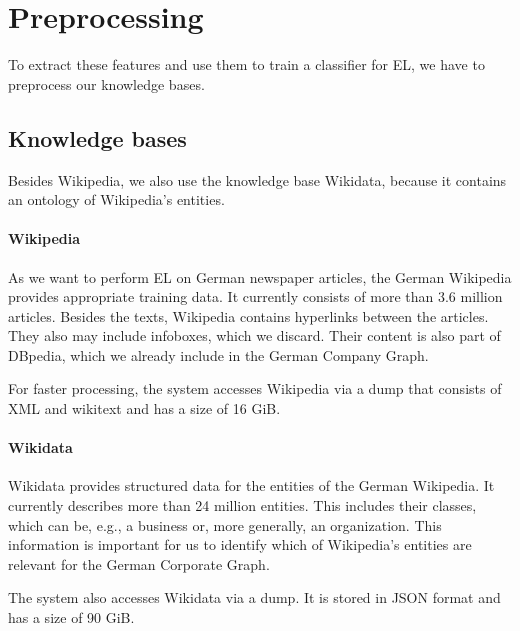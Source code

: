 \section{Preprocessing}
\label{sec:preprocessing}
To extract these features and use them to train a classifier for EL, we have to preprocess our knowledge bases.



\subsection{Knowledge bases}
Besides Wikipedia, we also use the knowledge base Wikidata, because it contains an ontology of Wikipedia's entities.


\paragraph{Wikipedia}
As we want to perform EL on German newspaper articles, the German Wikipedia provides appropriate training data. It currently consists of more than 3.6 million articles. Besides the texts, Wikipedia contains hyperlinks between the articles. They also may include infoboxes, which we discard. Their content is also part of DBpedia\footnotemark{}, which we already include in the German Company Graph.

For faster processing, the system accesses Wikipedia via a dump\footnotemark{} that consists of XML and wikitext and has a size of 16 GiB.


\paragraph{Wikidata}
Wikidata\footnotemark{} provides structured data for the entities of the German Wikipedia. It currently describes more than 24 million entities. This includes their classes, which can be, e.g., a business or, more generally, an organization. This information is important for us to identify which of Wikipedia's entities are relevant for the German Corporate Graph.

The system also accesses Wikidata via a dump\footnotemark{}. It is stored in JSON format and has a size of 90 GiB.



